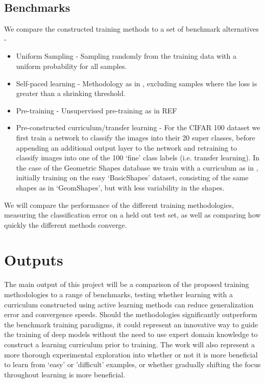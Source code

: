\documentclass[a4paper,10.5pt]{article}
\begin{document}
\subsection*{Benchmarks}
We compare the constructed training methods to a set of benchmark alternatives -
\begin{itemize}
	\item Uniform Sampling - Sampling randomly from the training data with a uniform probability for all samples.
	\item Self-paced learning - Methodology as in \cite{Koller 2010}, excluding samples where the loss is greater than a shrinking threshold.
	\item Pre-training - Unsupervised pre-training as in REF
	\item Pre-constructed curriculum/transfer learning - For the CIFAR 100 dataset we first train a network to classify the images into their 20 super classes, before appending an additional output layer to the network and retraining to classify images into one of the 100 `fine' class labels (i.e. transfer learning). In the case of the Geometric Shapes database we train with a curriculum as in \cite{Bengio 09}, initially training on the easy `BasicShapes' dataset, consisting of the same shapes as in `GeomShapes', but with less variability in the shapes. 
\end{itemize}

We will compare the performance of the different training methodologies, measuring the classification error on a held out test set, as well as comparing how quickly the different methods converge. 


\section{Outputs}
The main output of this project will be a comparison of the proposed training methodologies to a range of benchmarks, testing whether learning with a curriculum constructed using active learning methods can reduce generalization error and convergence speeds. Should the methodologies significantly outperform the benchmark training paradigms, it could represent an innovative way to guide the training of deep models without the need to use expert domain knowledge to construct a learning curriculum prior to training. The work will also represent a more thorough experimental exploration into whether or not it is more beneficial to learn from `easy' or 'difficult' examples, or whether gradually shifting the focus throughout learning is more beneficial.
\end{document}
